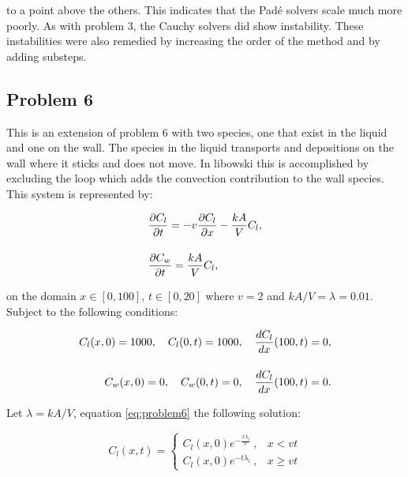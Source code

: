 \clearpage

\noindent to a point above the others. This indicates that the Pad\'e solvers scale much more poorly. As with problem 3, the Cauchy solvers did show instability. These instabilities were also remedied by increasing the order of the method and by adding substeps. 

\subsection{Problem 6}
This is an extension of problem 6 with two species, one that exist in the liquid and one on the wall. The species in the liquid transports and depositions on the wall where it sticks and does not move. In libowski this is accomplished by excluding the loop which adds the convection contribution to the wall species. This system is represented by:

\begin{equation}
\setlength{\jot}{15pt}
\begin{split}
    &\frac{\partial C_{l}}{\partial t} = -v\frac{\partial C_{l}}{\partial x} - \frac{kA}{V} C_{l}, \\
    &\frac{\partial C_{w}}{\partial t} = \frac{kA}{V} C_{l},
    \label{eq:problem6}
\end{split}
\end{equation}

\noindent on the domain $x \in [0,100]$, $t \in [0, 20]$ where $v = 2$ and $kA/V = \lambda = 0.01$. Subject to the following conditions:

\begin{equation}
\setlength{\jot}{15pt}
\begin{split}
    C_{l}(x, 0) = 1000, \quad C_{l}(0,t) = 1000, \quad \frac{dC_{l}}{dx}(100, t) = 0, \\
    C_{w}(x, 0) = 0, \quad C_{w}(0,t) = 0, \quad \frac{dC_{l}}{dx}(100, t) = 0. \\
\end{split}
\end{equation}

\noindent Let $\lambda = kA/V$, equation \ref{eq:problem6} the following solution:

\begin{equation}
C_{l} (x,t) = \begin{cases}
  C_{l} (x, 0) e^{-\frac{x \lambda _i}{v}}\ , & x < vt \\
  C_{l} (x, 0) e^{-t \lambda _i}\ , & x \ge vt
\end{cases}
\end{equation}

